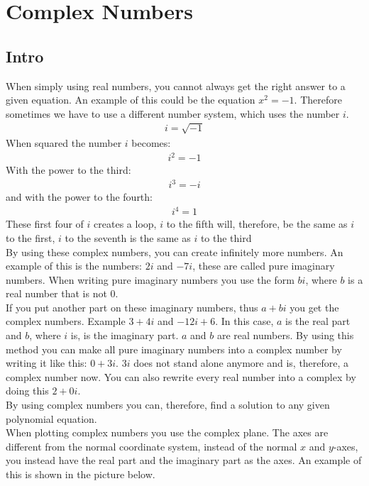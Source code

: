 \chapter{Complex Numbers}
\section{Intro}
When simply using real numbers, you cannot always get the right answer to a given equation. An example of this could be the equation $x^2=-1$. Therefore sometimes we have to use a different number system, which uses the number $i$. 
\begin{align*}
i=\sqrt{-1}
\end{align*}
When squared the number $i$ becomes:
\begin{align*}
i^2=-1
\end{align*}
With the power to the third:
\begin{align*}
i^3=-i
\end{align*}
and with the power to the fourth:
\begin{align*}
i^4=1
\end{align*}
These first four of $i$ creates a loop, $i$ to the fifth will, therefore, be the same as $i$ to the first, $i$ to the seventh is the same as $i$ to the third \\
By using these complex numbers, you can create infinitely more numbers.  
An example of this is the numbers: $2i$ and $-7i$, these are called pure imaginary numbers. When writing pure imaginary numbers you use the form $bi$, where $b$ is a real number that is not $0$. \\
If you put another part on these imaginary numbers, thus $a+bi$ you get the complex numbers. Example $3+4i$ and $-12i+6$. In this case, $a$ is the real part and $b$, where $i$ is, is the imaginary part. $a$ and $b$ are real numbers. By using this method you can make all pure imaginary numbers into a complex number by writing it like this: $0+3i$. $3i$ does not stand alone anymore and is, therefore, a complex number now. You can also rewrite every real number into a complex by doing this $2+0i$. \\
By using complex numbers you can, therefore, find a solution to any given polynomial equation. \\ 
When plotting complex numbers you use the complex plane. The axes are different from the normal coordinate system, instead of the normal $x$ and $y$-axes, you instead have the real part and the imaginary part as the axes. An example of this is shown in the picture below.
